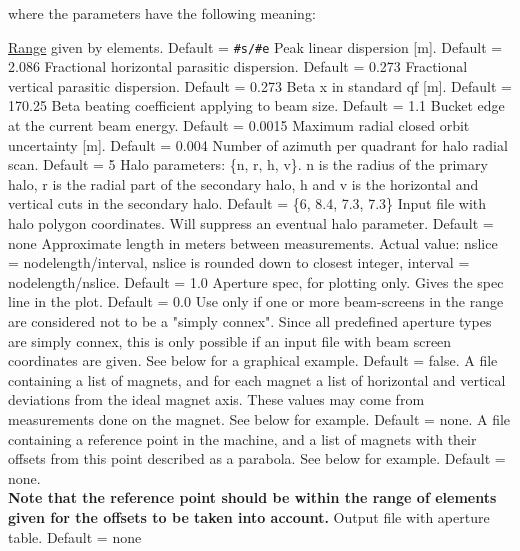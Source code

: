 where the parameters have the following meaning: 
\begin{madlist}
	 \hyperref[sec:range]{Range} given by
	elements. Default = {\tt \#s/\#e}  
	 Peak linear dispersion [m]. Default = 2.086 
	 Fractional horizontal parasitic dispersion. Default = 0.273 
	 Fractional vertical parasitic dispersion. Default = 0.273 
	 Beta x in standard qf [m]. Default = 170.25 
	 Beta beating coefficient applying to beam size. Default = 1.1 
	 Bucket edge at the current beam energy. Default = 0.0015 
	 Maximum radial closed orbit uncertainty [m]. Default = 0.004 
	 Number of azimuth per quadrant for halo radial scan. Default = 5 
	 Halo parameters: \{n, r, h, v\}. n is the radius of the
	primary halo,  r is the radial part of the secondary halo, h and v
	is the horizontal and  vertical cuts in the secondary halo. Default
	= \{6, 8.4, 7.3, 7.3\}  
	 Input file with halo polygon coordinates. Will
	suppress  an eventual halo parameter. Default = none  
	 Approximate length in meters between
	measurements. Actual value:  nslice = nodelength/interval, nslice
	is rounded down to closest integer,  interval =
	nodelength/nslice. Default = 1.0  
	 Aperture spec, for plotting only. Gives the spec line in
	the plot. Default = 0.0  
	 Use only if one or more beam-screens in the range are
	considered not to  be a "simply connex". Since all predefined \madx aperture 
	types are simply connex, this is only possible  if an input file with
	beam screen coordinates are given. See below for a graphical
	example. Default = false.  
	 A file containing a list of magnets, and for each
	magnet a list of horizontal and vertical deviations from the ideal
	magnet axis. These values may come from measurements done on the
	magnet. See below for example. Default = none.  
	 A file containing a reference point in the machine,
	and a list of magnets with their offsets from this point described
	as a parabola. See below for example. Default = none. \\
	{\bf Note that the reference point should be within the range of
	elements given for the offsets to be taken into account.}
	 Output file with aperture table. Default = none 
\end{madlist}

